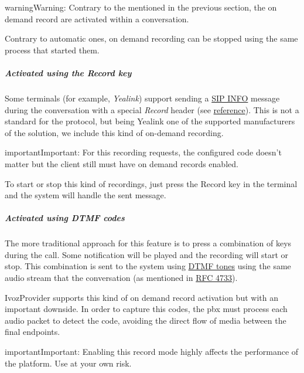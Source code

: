 \documentclass[letterpaper,10pt,english]{sphinxmanual}
\begin{document}
\begin{notice}{warning}{Warning:}
Contrary to the {\hyperref[administration_portal/platform/services:services]{}} mentioned in the
previous section, the on demand record are activated within a conversation.
\end{notice}

Contrary to automatic ones, on demand recording can be stopped using the same
process that started them.


\subparagraph{Activated using the \emph{Record} key}
\label{administration_portal/client/retail/calls/call_recordings:activated-using-the-record-key}
Some terminals (for example, \emph{Yealink}) support sending a \href{https://tools.ietf.org/html/rfc6086}{SIP INFO} message during the conversation with a
special \emph{Record} header (see \href{http://www.yealink.com/Upload/document/UsingCallRecordingFeatureonYealinkPhones/UsingCallRecordingFeatureonYealinkSIPT2XPphonesRev\_610-20561729764.pdf}{reference}).
This is not a standard for the protocol, but being Yealink one of the supported
manufacturers of the solution, we include this kind of on-demand recording.

\begin{notice}{important}{Important:}
For this recording requests, the configured code doesn't matter
but the client still must have on demand records enabled.
\end{notice}

To start or stop this kind of recordings, just press the Record key in the
terminal and the system will handle the sent message.


\subparagraph{Activated using \emph{DTMF} codes}
\label{administration_portal/client/retail/calls/call_recordings:activated-using-dtmf-codes}
The more traditional approach for this feature is to press a combination of
keys during the call. Some notification will be played and the recording will
start or stop. This combination is sent to the system using \href{https://es.wikipedia.org/wiki/Marcaci\%C3\%B3n\_por\_tonos}{DTMF tones} using the same audio
stream that the conversation (as mentioned in \href{https://tools.ietf.org/html/rfc4733}{RFC 4733}).

IvozProvider supports this kind of on demand record activation but with an
important downside. In order to capture this codes, the pbx must process each
audio packet to detect the code, avoiding the direct flow of media between the
final endpoints.

\begin{notice}{important}{Important:}
Enabling this record mode highly affects the performance of the
platform. Use at your own risk.
\end{notice}
\end{document}
